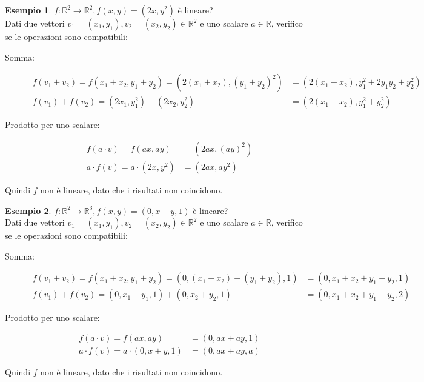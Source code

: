 \documentclass[a4paper]{article}
\theoremstyle{definition}
\newtheorem*{es}{Esempio}
\begin{document}
\begin{es}
	$f: \mathbb{R}^2 \rightarrow \mathbb{R}^2, f(x, y) = (2x, y^2)$ è lineare? \\
	Dati due vettori $v_1 = (x_1, y_1), v_2 = (x_2, y_2) \in \mathbb{R}^2$ e uno scalare $a \in \mathbb{R}$, verifico se le operazioni sono compatibili:
	\begin{description}
		\item[Somma:]
			\begin{align*}
				f(v_1 + v_2) = f(x_1 + x_2, y_1 + y_2) = (2(x_1 + x_2), (y_1 + y_2)^2) & = (2(x_1 + x_2), y_1^2 + 2y_1y_2 + y_2^2) \\
				f(v_1) + f(v_2) = (2x_1, y_1^2) + (2x_2, y_2^2)                        & = (2(x_1 + x_2), y_1^2 + y_2^2)
			\end{align*}
		\item[Prodotto per uno scalare:]
			\begin{align*}
				f(a \cdot v) = f(ax, ay)         & = (2ax, (ay)^2) \\
				a \cdot f(v) = a \cdot (2x, y^2) & = (2ax, ay^2)
			\end{align*}
	\end{description}
	Quindi $f$ non è lineare, dato che i risultati non coincidono.
\end{es}
\begin{es}
	$f: \mathbb{R}^2 \rightarrow \mathbb{R}^3, f(x, y) = (0, x+y, 1)$ è lineare? \\
	Dati due vettori $v_1 = (x_1, y_1), v_2 = (x_2, y_2) \in \mathbb{R}^2$ e uno scalare $a \in \mathbb{R}$, verifico se le operazioni sono compatibili:
	\begin{description}
		\item[Somma:] 
		\begin{align*}
			f(v_1 + v_2) = f(x_1 + x_2, y_1 + y_2) = (0, (x_1 + x_2) + (y_1 + y_2), 1) & = (0, x_1 + x_2 + y_1 + y_2, 1) \\
			f(v_1) + f(v_2) = (0, x_1 + y_1, 1) + (0, x_2 + y_2, 1)                    & = (0, x_1 + x_2 + y_1 + y_2, 2)
		\end{align*}
		\item[Prodotto per uno scalare:]
		\begin{align*}
			f(a \cdot v) = f(ax, ay)             & = (0, ax + ay, 1) \\
			a \cdot f(v) = a \cdot (0, x + y, 1) & = (0, ax + ay, a)
		\end{align*}
	\end{description}
	Quindi $f$ non è lineare, dato che i risultati non coincidono.
\end{es}
\end{document}
